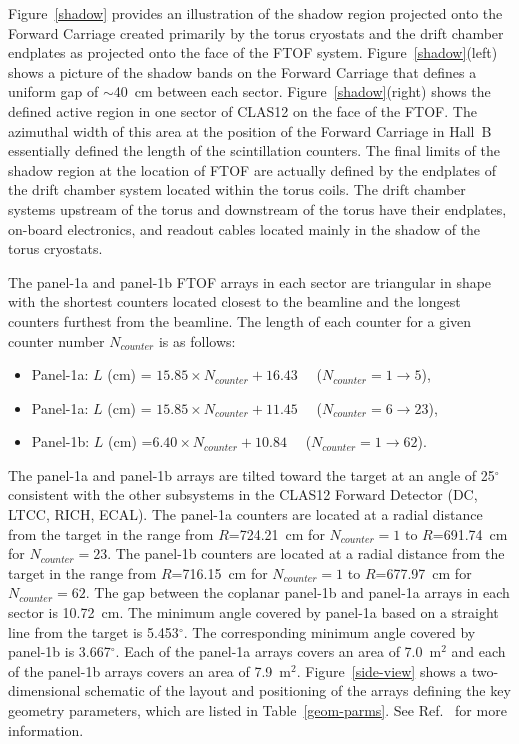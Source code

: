 \documentclass{elsart}
\begin{document}
Figure~\ref{shadow} provides an illustration of the shadow region projected onto the Forward Carriage
created primarily by the torus cryostats and the drift chamber endplates as projected onto the face of
the FTOF system. Figure~\ref{shadow}(left) shows a picture of the shadow bands on the Forward
Carriage that defines a uniform gap of $\sim$40~cm between each sector. Figure~\ref{shadow}(right)
shows the defined active region in one sector of CLAS12 on the face of the FTOF. The azimuthal width
of this area at the position of the Forward Carriage in Hall~B essentially defined the length of the
scintillation counters. The final limits of the shadow region at the location of FTOF are actually defined
by the endplates of the drift chamber system located within the torus coils. The drift chamber systems
upstream of the torus and downstream of the torus have their endplates, on-board electronics, and readout
cables located mainly in the shadow of the torus cryostats.

The panel-1a and panel-1b FTOF arrays in each sector are triangular in shape with the shortest counters
located closest to the beamline and the longest counters furthest from the beamline. The length of each
counter for a given counter number $N_{counter}$ is as follows:

\begin{itemize}
\item Panel-1a: $L$ (cm) = $15.85 \times N_{counter} + 16.43$ ~~($N_{counter} = 1 \to 5$), 
\item Panel-1a: $L$ (cm) = $15.85 \times N_{counter} + 11.45$ ~~($N_{counter} = 6 \to 23$), 
\item Panel-1b: $L$ (cm) =$ 6.40 \times N_{counter} + 10.84$ ~~($N_{counter} = 1 \to 62$).
\end{itemize}

The panel-1a and panel-1b arrays are tilted toward the target at an angle of 25$^{\circ}$ consistent with
the other subsystems in the CLAS12 Forward Detector (DC, LTCC, RICH, ECAL). The panel-1a counters
are located at a radial distance from the target in the range from $R$=724.21~cm for $N_{counter} = 1$ to
$R$=691.74~cm for $N_{counter} =23$. The panel-1b counters are located at a radial distance from the
target in the range from $R$=716.15~cm for $N_{counter} = 1$ to $R$=677.97~cm for $N_{counter}=62$.
The gap between the coplanar panel-1b and panel-1a arrays in each sector is 10.72~cm. The minimum angle
covered by panel-1a based on a straight line from the target is 5.453$^\circ$. The corresponding minimum
angle covered by panel-1b is 3.667$^\circ$. Each of the panel-1a arrays covers an area of 7.0~m$^2$ and
each of the panel-1b arrays covers an area of 7.9~m$^2$. Figure~\ref{side-view} shows a two-dimensional
schematic of the layout and positioning of the arrays defining the key geometry parameters, which are
listed in Table~\ref{geom-parms}. See Ref.~\cite{ftof-geom} for more information.
\end{document}
